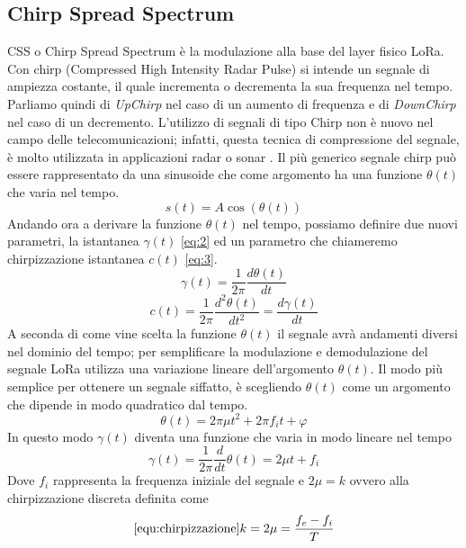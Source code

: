 \subsection{Chirp Spread Spectrum}
CSS o Chirp Spread Spectrum è la modulazione alla base del layer fisico LoRa. 
Con chirp (Compressed High Intensity Radar Pulse) si intende un segnale di
ampiezza costante, il quale incrementa o decrementa la sua frequenza nel tempo.
Parliamo quindi di \emph{UpChirp} nel caso di un aumento di frequenza e di
\emph{DownChirp} nel caso di un decremento.
L'utilizzo di segnali di tipo Chirp non è nuovo nel campo delle
telecomunicazioni; infatti, questa tecnica di compressione del segnale, 
è molto utilizzata in applicazioni radar o  sonar .
Il più generico segnale chirp può essere rappresentato da una sinusoide che come
argomento ha una funzione $\theta(t)$ che varia nel tempo.
\begin{equation}\label{eq:1}
        s(t) = A\cos(\theta (t))
\end{equation}
Andando ora a derivare la funzione  $\theta(t)$ nel tempo, possiamo  definire due
nuovi parametri, la  istantanea $\gamma(t)$ \ref{eq:2} ed un parametro che
chiameremo chirpizzazione istantanea $c(t)$ \ref{eq:3}.
\begin{equation}\label{eq:2}
        \gamma(t) = \frac{1}{2\pi} \frac{d\theta(t)}{dt}
\end{equation}
\begin{equation}\label{eq:3}
        c(t) = \frac{1}{2\pi}\frac{d^2\theta(t)}{dt^2} = \frac{d\gamma(t)}{dt}
\end{equation}
A seconda di come vine scelta la funzione $\theta(t)$ il segnale avrà
andamenti diversi nel dominio del tempo; per semplificare la modulazione e
demodulazione del segnale LoRa utilizza una variazione lineare dell'argomento
$\theta(t)$.
Il modo più semplice per ottenere un segnale siffatto, è scegliendo $\theta(t)$
come un argomento che dipende in modo quadratico dal tempo.
\begin{equation}
        \theta(t) = 2\pi\mu t^2+2\pi f_it+\varphi
\end{equation}
In questo modo $\gamma(t)$ diventa una funzione che varia in modo lineare nel
tempo
\begin{equation}
        \gamma(t) = \frac{1}{2\pi}\frac{d}{dt}\theta(t)  = 2\mu t+ f_i
\end{equation}
Dove $f_i$ rappresenta la frequenza iniziale del segnale e $2\mu = k$ ovvero
alla chirpizzazione discreta definita come
\begin{equation}\ref{equ:chirpizzazione}
        k =2\mu =  \frac{f_e-f_i}{T}
\end{equation}
